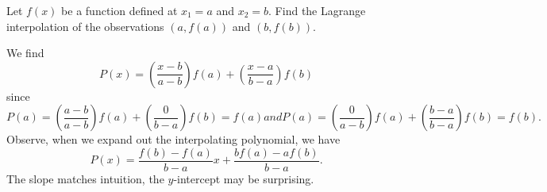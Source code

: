 \begin{ex}
  Let $f(x)$ be a function defined at $x_{1}=a$ and $x_{2}=b$. Find the
  Lagrange interpolation of the observations $(a, f(a))$ and $(b, f(b))$.

  We find
  \begin{equation}
    P(x) = \left(\frac{x-b}{a-b}\right)f(a) + \left(\frac{x-a}{b-a}\right)f(b)
  \end{equation}
  since
  \begin{subequations}
  \begin{equation}
    P(a) = \left(\frac{a-b}{a-b}\right)f(a) + \left(\frac{0}{b-a}\right)f(b)=f(a)
  \end{equation}
  and
  \begin{equation}
    P(a) = \left(\frac{0}{a-b}\right)f(a) + \left(\frac{b-a}{b-a}\right)f(b)=f(b).
  \end{equation}
  \end{subequations}
  Observe, when we expand out the interpolating polynomial, we have
  \begin{equation}
    P(x) = \frac{f(b) - f(a)}{b - a}x +\frac{bf(a) - af(b)}{b - a}.
  \end{equation}
  The slope matches intuition, the $y$-intercept may be surprising.
\end{ex}

